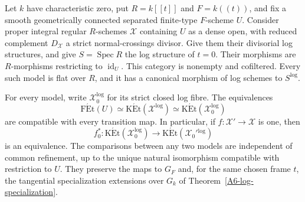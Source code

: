 \begin{theorem}
\label{A6-model-specialization}
Let $k$ have characteristic zero, put $R=k[[t]]$ and $F=k((t))$, and fix
a smooth geometrically connected separated finite-type $F$-scheme $U$.
Consider proper integral regular $R$-schemes $\mathcal X$ containing
$U$ as a dense open, with reduced complement $D_{\mathcal X}$ a strict
normal-crossings divisor. Give them their divisorial log structures,
and give $S=\operatorname{Spec}R$ the log structure of $t=0$.
Their morphisms are $R$-morphisms restricting to $\operatorname{id}_U$.
This category is nonempty and cofiltered. Every such model is flat
over $R$, and it has a canonical morphism of log schemes to $S^{\log}$.

For every model, write $\mathcal X_0^{\log}$ for its strict closed
log fibre. The equivalences
\[
 \operatorname{F\acute Et}(U)
 \simeq\operatorname{K\acute Et}(\mathcal X^{\log})
 \simeq\operatorname{K\acute Et}(\mathcal X_0^{\log})
\]
are compatible with every transition map. In particular, if
$f:\mathcal X'\to\mathcal X$ is one, then
\[
 f_0^*:\operatorname{K\acute Et}(\mathcal X_0^{\log})
       \longrightarrow
       \operatorname{K\acute Et}(\mathcal X_0'{}^{\log})
\]
is an equivalence. The comparisons between any two models are independent
of common refinement, up to the unique natural isomorphism compatible
with restriction to $U$. They preserve the maps to $G_F$ and, for the
same chosen frame $t$, the tangential specialization extensions over
$G_k$ of Theorem~\ref{A6-log-specialization}.
\end{theorem}
